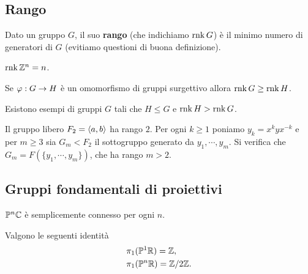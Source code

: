 \begin{multicols*}{2}
\subsection{Rango}
\begin{definition}[Rango]
Dato un gruppo $G$, il suo \textbf{rango} (che indichiamo $\mathrm{rnk}\, G$) \`e il minimo numero di generatori di $G$ (evitiamo questioni di buona definizione).
\end{definition}
\begin{example}[Rango di $\Z^n$]
$\mathrm{rnk}\, \mathbb{Z}^n=n$.
\end{example}

\begin{remark}\label{RangoEOmomorfismiSurgettivi}
Se $\varphi:G\to H$ \`e un omomorfismo di gruppi surgettivo allora $\mathrm{rnk}\, G\geq \mathrm{rnk}\, H$.
\end{remark}

\begin{remark}\label{RangoDiSottogruppiPuoCrescere}
Esistono esempi di gruppi $G$ tali che $H\leq G$ e $\mathrm{rnk}\, H>\mathrm{rnk}\, G$.
\end{remark}

\begin{example}
Il gruppo libero $F_2=\left\langle a,b\right\rangle$ ha rango $2$. Per ogni $k\geq 1$ poniamo $y_k=x^kyx^{-k}$ e per $m\geq 3$ sia $G_m<F_2$ il sottogruppo generato da $y_1,\cdots, y_m$. Si verifica che $G_m=F(\{y_1,\cdots,y_m\})$, che ha rango $m>2$.
\end{example}

\subsection{Gruppi fondamentali di proiettivi}
\begin{theorem}\label{ProiettiviComplessiSonoSemplicementeConnessi}
$\mathbb{P}^n\mathbb{C}$ \`e semplicemente connesso per ogni $n$.
\end{theorem}

\begin{theorem}\label{GruppiFondamentaliProiettiviReali}
Valgono le seguenti identit\`a
\begin{align*}
&\pi_1(\mathbb{P}^1\mathbb{R})=\mathbb{Z},\\
&\pi_1(\mathbb{P}^n\mathbb{R})={\mathbb{Z}/2\mathbb{Z}}.
\end{align*}
\end{theorem}


\end{multicols*}
